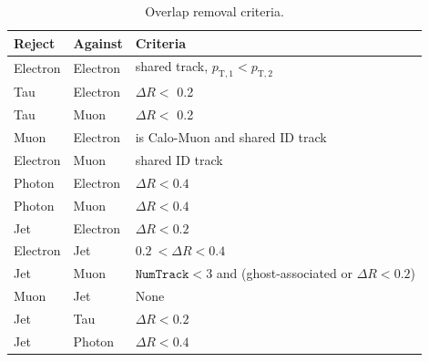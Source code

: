 \begin{table}[ht]
  \caption{Overlap removal criteria.}%
  \label{tab:or}
  \centering 
  \begin{tabular}{lll}
    \toprule
    Reject & Against & Criteria \\
    \midrule
    Electron	& Electron & shared track, \(p_{\text{T},1} < p_{\text{T},2}\) \\
    Tau      	 	& Electron & \(\Delta R <\) 0.2 \\
    Tau       	 	& Muon     & \(\Delta R <\) 0.2 \\
    Muon     	& Electron & is Calo-Muon and shared ID track \\
    Electron 	& Muon     & shared ID track \\
    Photon   	& Electron & \(\Delta R < 0.4\) \\
    Photon   	& Muon     & \(\Delta R < 0.4\) \\
    Jet      		& Electron & \(\Delta R < 0.2\) \\
    Electron 	& Jet      & \(0.2\ < \Delta R < 0.4\) \\
    Jet      		& Muon     & \(\texttt{NumTrack} < 3\) and (ghost-associated or \(\Delta R < 0.2\)) \\
                       	
    Muon     	& Jet      & None \\
    Jet      		& Tau      & \(\Delta R < 0.2\) \\
    Jet   	& Photon      & \(\Delta R < 0.4\) \\
    \bottomrule
  \end{tabular}
\end{table}

